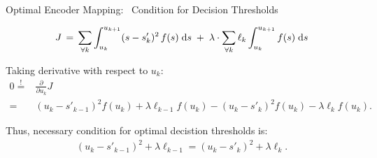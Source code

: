 

\begin{frame}{Optimal Encoder Mapping:~ Condition for Decision Thresholds}


  \vspace{-1.0ex}
  $$
  J\,=\,\sum_{\forall k}\int_{u_k}^{u_{k+1}}(s-s'_k)^2\,f(s)\;\mathrm{d} s
  \;+\;\lambda\cdot\sum_{\forall k}\ell_k\int_{u_k}^{u_{k+1}}f(s)\;\mathrm{d} s
  $$
  \medskip

\bit
\item
Taking derivative with respect to $u_k$: 
\begin{align*}
0\stackrel{!}{=}&\frac{\partial}{\partial u_k}J\\
=&(u_k-s'_{k-1})^2f(u_k)+\lambda\ell_{k-1}f(u_k)-(u_k-s'_k)^2f(u_k)-\lambda\ell_{k}f(u_k).
\end{align*}
\item[\iarrow]Thus, necessary condition for optimal decistion thresholds is: 
\begin{align*}
(u_k-s'_{k-1})^2+\lambda\ell_{k-1}=(u_k-s'_k)^2+\lambda\ell_{k}.
\end{align*}

\eit


\end{frame}
